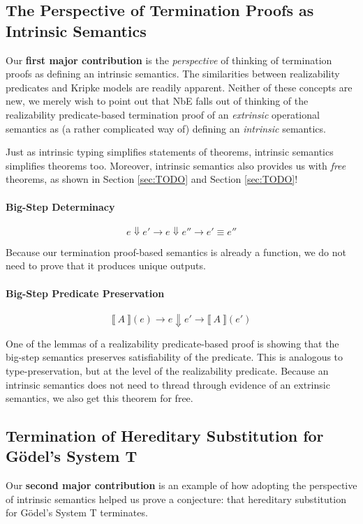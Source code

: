 \documentclass[preprint,nonatbib]{sigplanconf}
\numberwithin{subdefin}{defin}
\numberwithin{subtheorem}{theorem}
\newcommand{\refsec}[1]{Section \ref{sec:#1}}
\def\bigstep{\Downarrow}
\def\marr{\rightarrow}
\newcommand{\el}[1]{\llbracket ~ #1 ~ \rrbracket}
\begin{document}
\subsection{The Perspective of Termination Proofs as Intrinsic Semantics}

Our {\bf first major contribution} is the {\it perspective} of thinking of
termination proofs as defining an intrinsic semantics.
The similarities between realizability predicates and Kripke models are
readily apparent. Neither of these concepts are new, we merely wish
to point out that NbE falls out of thinking of the
realizability predicate-based termination proof of an {\it extrinsic}
operational semantics as (a rather complicated way of) defining an {\it intrinsic}
semantics.

Just as intrinsic typing simplifies statements of theorems, intrinsic semantics simplifies
theorems too. Moreover, intrinsic semantics also provides us with
{\it free} theorems, as shown in \refsec{TODO} and \refsec{TODO}!

\paragraph{Big-Step Determinacy}

$$
e \bigstep e' \marr e \bigstep e'' \marr e' \equiv e''
$$

Because our termination proof-based semantics is already a function,
we do not need to prove that it produces unique outputs.

\paragraph{Big-Step Predicate Preservation}

$$
\el{A}(e) \marr e \bigstep e' \marr \el{A}(e')
$$

One of the lemmas of a realizability predicate-based proof is showing that
the big-step semantics preserves satisfiability
of the predicate. This is analogous to type-preservation, but at the
level of the realizability predicate. Because an intrinsic semantics
does not need to thread through evidence of an extrinsic semantics, we
also get this theorem for free.

\subsection{Termination of Hereditary Substitution for G{\"o}del's System T}

Our {\bf second major contribution} is an example of how adopting the
perspective of intrinsic semantics helped us prove a conjecture:
that hereditary substitution for G{\"o}del's System T terminates.
\end{document}
